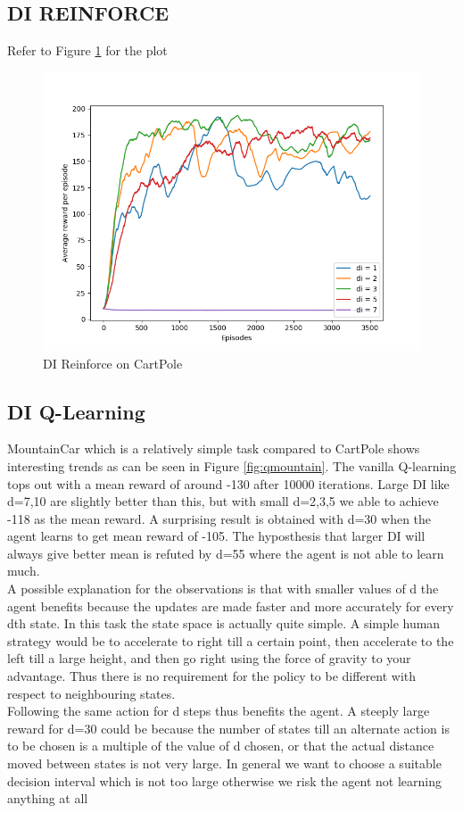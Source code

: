\documentclass{article}
\begin{document}
\subsection{DI REINFORCE}
Refer to Figure \ref{fig:rein} for the plot
\begin{figure}
    
  \centering
  \includegraphics[scale=0.7]{Reinforce_CartPole.png}
  \caption{DI Reinforce on CartPole}
\label{fig:rein}
\end{figure}

\subsection{DI Q-Learning}
MountainCar which is a relatively simple task compared to CartPole shows interesting trends as can be seen in Figure \ref{fig:qmountain}. The vanilla Q-learning tops out with a mean reward of around -130 after 10000 iterations. Large DI like d=7,10 are slightly better than this, but with small d=2,3,5 we able to achieve -118 as the mean reward. A surprising result is obtained with d=30 when the agent learns to get mean reward of -105. The hyposthesis that larger DI will always give better mean is refuted by d=55 where the agent is not able to learn much.\\
A possible explanation for the observations is that with smaller values of d the agent benefits because the updates are made faster and more accurately for every dth state. In this task the state space is actually quite simple. A simple human strategy would be to accelerate to right till a certain point, then accelerate to the left till a large height, and then go right using the force of gravity to your advantage. Thus there is no requirement for the policy to be different with respect to neighbouring states. \\
Following the same action for d steps thus benefits the agent. A steeply large reward for d=30 could be because the number of states till an alternate action is to be chosen is a multiple of the value of d chosen, or that the actual distance moved between states is not very large. In general we want to choose a suitable decision interval which is not too large otherwise we risk the agent not learning anything at all
    
\end{document}
